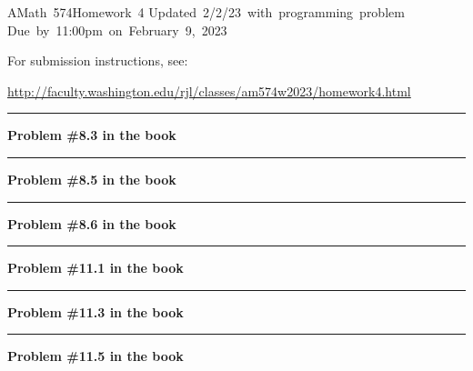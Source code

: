 \documentclass[11pt]{article}
\begin{document}
\hfill\vbox{\hbox{AMath 574}\hbox{Homework 4}
\hbox{Updated 2/2/23 with programming problem}
\hbox{Due by 11:00pm on February 9, 2023}}

For submission instructions, see:

\url{http://faculty.washington.edu/rjl/classes/am574w2023/homework4.html}

\vskip 1cm
\hrule
{\bf Problem \#8.3 in the book}




\vskip 1cm
\hrule
{\bf Problem \#8.5 in the book}



\vskip 1cm
\hrule
{\bf Problem \#8.6 in the book}



\vskip 1cm
\hrule
{\bf Problem \#11.1 in the book}



\vskip 1cm
\hrule
{\bf Problem \#11.3 in the book}



\vskip 1cm
\hrule
{\bf Problem \#11.5 in the book}


\end{document}
